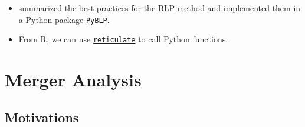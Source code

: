 \documentclass[
]{book}
\providecommand{\tightlist}{%
  \setlength{\itemsep}{0pt}\setlength{\parskip}{0pt}}
\begin{document}
\begin{itemize}
\tightlist
\item
  \citet{conlonBestPracticesDifferentiated2020} summarized the best practices for the BLP method and implemented them in a Python package \href{https://pyblp.readthedocs.io/}{\texttt{PyBLP}}.
\item
  From R, we can use \href{https://rstudio.github.io/reticulate/}{\texttt{reticulate}} to call Python functions.
\end{itemize}

\hypertarget{merger}{%
\chapter{Merger Analysis}\label{merger}}

\hypertarget{motivations-2}{%
\section{Motivations}\label{motivations-2}}
\end{document}
